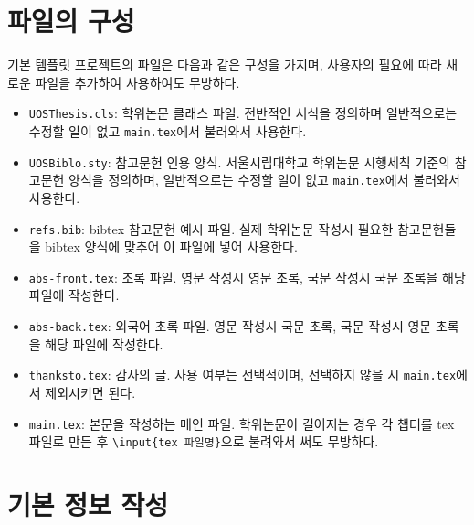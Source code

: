 \documentclass[ko]{UOSThesis}
\begin{document}
\begingroup
\pagestyle{empty}

\makefrontcover
\makeproposal
\makeapproval

\begin{FrontAbstract}
    
\end{FrontAbstract}

\makefrontcover

\endgroup

\frontmatter

\maketableofcontents
\makelistoftables
\makelistofigures

\mainmatter

\chapter{파일의 구성}

기본 템플릿 프로젝트의 파일은 다음과 같은 구성을 가지며, 사용자의 필요에 따라 새로운 파일을 추가하여 사용하여도 무방하다.
\begin{itemize}
\singlespacing
\small
    \item \texttt{UOSThesis.cls}: 학위논문 클래스 파일. 전반적인 서식을 정의하며 일반적으로는 수정할 일이 없고 \texttt{main.tex}에서 불러와서 사용한다.
    \item \texttt{UOSBiblo.sty}: 참고문헌 인용 양식. 서울시립대학교 학위논문 시행세칙 기준의 참고문헌 양식을 정의하며, 일반적으로는 수정할 일이 없고 \texttt{main.tex}에서 불러와서 사용한다.
    \item \texttt{refs.bib}: bibtex 참고문헌 예시 파일. 실제 학위논문 작성시 필요한 참고문헌들을 bibtex 양식에 맞추어 이 파일에 넣어 사용한다.
    \item \texttt{abs-front.tex}: 초록 파일. 영문 작성시 영문 초록, 국문 작성시 국문 초록을 해당 파일에 작성한다.
    \item \texttt{abs-back.tex}: 외국어 초록 파일. 영문 작성시 국문 초록, 국문 작성시 영문 초록을 해당 파일에 작성한다.
    \item \texttt{thanksto.tex}: 감사의 글. 사용 여부는 선택적이며, 선택하지 않을 시 \texttt{main.tex}에서 제외시키면 된다.
    \item \texttt{main.tex}: 본문을 작성하는 메인 파일. 학위논문이 길어지는 경우 각 챕터를 tex 파일로 만든 후 \texttt{\textbackslash input\{tex 파일명\}}으로 불려와서 써도 무방하다.
\end{itemize}

\chapter{기본 정보 작성}
\label{chap:information}
\end{document}
